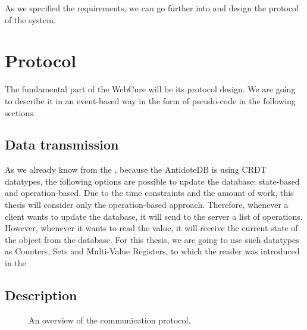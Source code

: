 As we specified the requirements, we can go further into and design the protocol of the system.

\section{Protocol}
\label{4-protocol}

The fundamental part of the WebCure will be its protocol design. We are going to describe it in an event-based way in the form of pseudo-code in the following sections. 


\subsection{Data transmission}

As we already know from the , because the AntidoteDB is using CRDT datatypes, the following options are possible to update the database: state-based and operation-based. Due to the time constraints and the amount of work, this thesis will consider only the operation-based approach. Therefore, whenever a client wants to update the database, it will send to the server a list of operations. However, whenever it wants to read the value, it will receive the current state of the object from the database. For this thesis, we are going to use such datatypes as Counters, Sets and Multi-Value Registers, to which the reader was introduced in the .

\subsection{Description} 

\begin{figure}[!htb]
    \begin{center}
    \def\svgwidth{0.6\linewidth}
    
    \caption {An overview of the communication protocol.}
    \label{fig:protocol1}
\end{center}
\end{figure}

